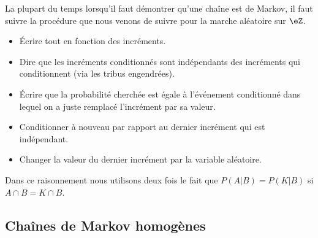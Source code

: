 \begin{remark}
    La plupart du temps lorsqu'il faut démontrer qu'une chaîne est de Markov, il faut suivre la procédure que nous venons de suivre pour la marche aléatoire sur \( \eZ\).
    \begin{itemize}
        \item Écrire tout en fonction des incréments.
        \item Dire que les incréments conditionnés sont indépendants des incréments qui conditionnent (via les tribus engendrées).
        \item Écrire que la probabilité cherchée est égale à l'événement conditionné dans lequel on a juste remplacé l'incrément par sa valeur.
        \item Conditionner à nouveau par rapport au dernier incrément qui est indépendant.
        \item Changer la valeur du dernier incrément par la variable aléatoire.
    \end{itemize}
    Dans ce raisonnement nous utilisons deux fois le fait que \( P(A|B)=P(K|B)\) si \( A\cap B=K\cap B\).
\end{remark}

\subsection{Chaînes de Markov homogènes}

